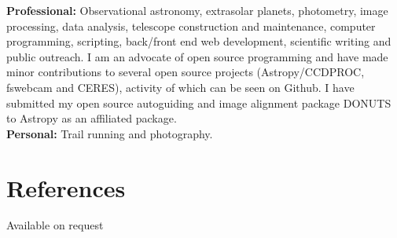 \documentclass[print]{friggeri-cv} %
\begin{document}
{\small \textbf{Professional:} Observational astronomy, extrasolar planets, photometry, image processing, data analysis, telescope construction and maintenance, computer programming, scripting, back/front end web development, scientific writing and public outreach. I am an advocate of open source programming and have made minor contributions to several open source projects (Astropy/CCDPROC, fswebcam and CERES), activity of which can be seen on Github. I have submitted my open source autoguiding and image alignment package DONUTS to Astropy as an affiliated package.}\\
{\small \textbf{Personal:} Trail running and photography.}


\section{References}
{\small  Available on request}
\end{document}
